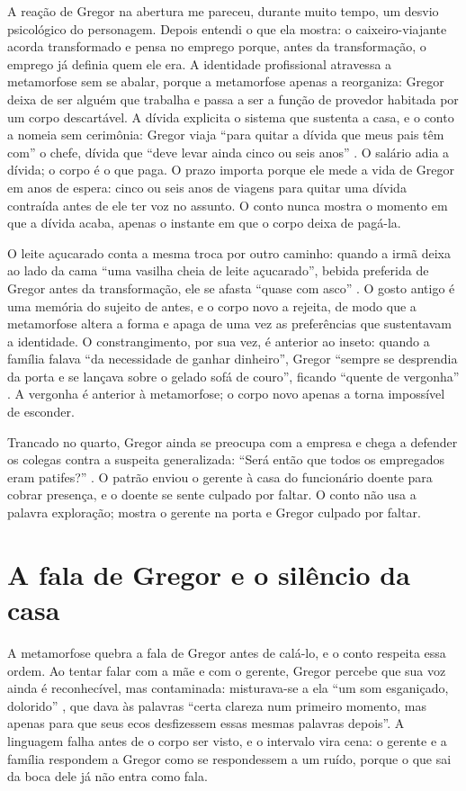 \documentclass[12pt]{article}
\begin{document}
A reação de Gregor na abertura me pareceu, durante muito tempo, um desvio psicológico do personagem. Depois entendi o que ela mostra: o caixeiro-viajante acorda transformado e pensa no emprego porque, antes da transformação, o emprego já definia quem ele era. A identidade profissional atravessa a metamorfose sem se abalar, porque a metamorfose apenas a reorganiza: Gregor deixa de ser alguém que trabalha e passa a ser a função de provedor habitada por um corpo descartável. A dívida explicita o sistema que sustenta a casa, e o conto a nomeia sem cerimônia: Gregor viaja ``para quitar a dívida que meus pais têm com'' o chefe, dívida que ``deve levar ainda cinco ou seis anos'' \cite[p. 10]{kafka2022}. O salário adia a dívida; o corpo é o que paga. O prazo importa porque ele mede a vida de Gregor em anos de espera: cinco ou seis anos de viagens para quitar uma dívida contraída antes de ele ter voz no assunto. O conto nunca mostra o momento em que a dívida acaba, apenas o instante em que o corpo deixa de pagá-la.

O leite açucarado conta a mesma troca por outro caminho: quando a irmã deixa ao lado da cama ``uma vasilha cheia de leite açucarado'', bebida preferida de Gregor antes da transformação, ele se afasta ``quase com asco'' \cite[p. 38]{kafka2022}. O gosto antigo é uma memória do sujeito de antes, e o corpo novo a rejeita, de modo que a metamorfose altera a forma e apaga de uma vez as preferências que sustentavam a identidade. O constrangimento, por sua vez, é anterior ao inseto: quando a família falava ``da necessidade de ganhar dinheiro'', Gregor ``sempre se desprendia da porta e se lançava sobre o gelado sofá de couro'', ficando ``quente de vergonha'' \cite[p. 50]{kafka2022}. A vergonha é anterior à metamorfose; o corpo novo apenas a torna impossível de esconder.

Trancado no quarto, Gregor ainda se preocupa com a empresa e chega a defender os colegas contra a suspeita generalizada: ``Será então que todos os empregados eram patifes?'' \cite[p. 17]{kafka2022}. O patrão enviou o gerente à casa do funcionário doente para cobrar presença, e o doente se sente culpado por faltar. O conto não usa a palavra exploração; mostra o gerente na porta e Gregor culpado por faltar.

\section{A fala de Gregor e o silêncio da casa}

A metamorfose quebra a fala de Gregor antes de calá-lo, e o conto respeita essa ordem. Ao tentar falar com a mãe e com o gerente, Gregor percebe que sua voz ainda é reconhecível, mas contaminada: misturava-se a ela ``um som esganiçado, dolorido'' \cite[p. 11]{kafka2022}, que dava às palavras ``certa clareza num primeiro momento, mas apenas para que seus ecos desfizessem essas mesmas palavras depois''. A linguagem falha antes de o corpo ser visto, e o intervalo vira cena: o gerente e a família respondem a Gregor como se respondessem a um ruído, porque o que sai da boca dele já não entra como fala.
\end{document}
